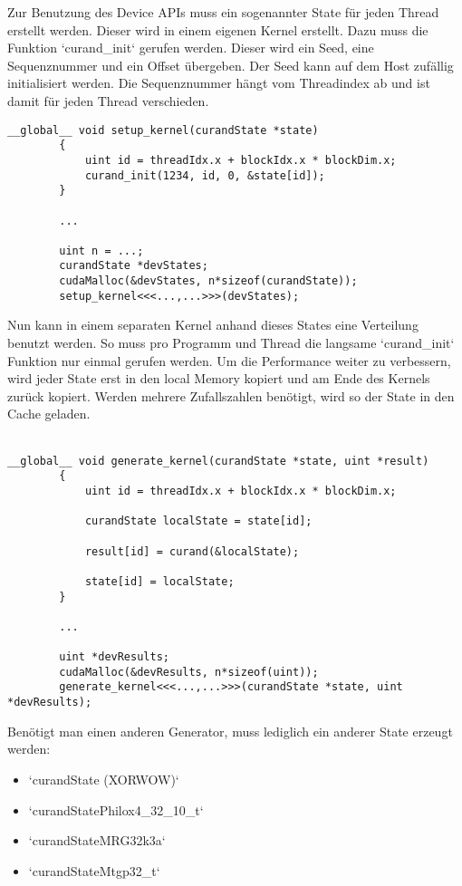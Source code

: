             Zur Benutzung des Device \Glspl{API} muss ein sogenannter State für jeden \Gls{Thread} erstellt werden. Dieser wird in einem eigenen \Gls{Kernel} erstellt.
            Dazu muss die Funktion \li`curand_init` gerufen werden. Dieser wird ein Seed, eine Sequenznummer und ein Offset übergeben. Der Seed kann auf dem Host zufällig initialisiert werden. Die Sequenznummer hängt vom \Gls{Thread}index ab und ist damit für jeden \Gls{Thread} verschieden.
            \begin{lstlisting}[caption=cuRAND: Device API States]
        __global__ void setup_kernel(curandState *state)
        {
            uint id = threadIdx.x + blockIdx.x * blockDim.x;
            curand_init(1234, id, 0, &state[id]);
        }
			
        ...
			
        uint n = ...;
        curandState *devStates;
        cudaMalloc(&devStates, n*sizeof(curandState));
        setup_kernel<<<...,...>>>(devStates);		
            \end{lstlisting}
			
            Nun kann in einem separaten \Gls{Kernel} anhand dieses States eine Verteilung benutzt werden. So muss pro Programm und \Gls{Thread} die langsame \li`curand_init` Funktion nur einmal gerufen werden. Um die Performance weiter zu verbessern, wird jeder State erst in den \gls{local Memory} kopiert und am Ende des \Glspl{Kernel} zurück kopiert. Werden mehrere Zufallszahlen benötigt, wird so der State in den Cache geladen.  \\ \\
            \begin{lstlisting}[caption=cuRAND: Device API Generierung]
        __global__ void generate_kernel(curandState *state, uint *result)
        {
            uint id = threadIdx.x + blockIdx.x * blockDim.x;

            curandState localState = state[id];

            result[id] = curand(&localState);
				
            state[id] = localState;
        }
			
        ...
			
        uint *devResults;
        cudaMalloc(&devResults, n*sizeof(uint));
        generate_kernel<<<...,...>>>(curandState *state, uint *devResults);
            \end{lstlisting}
			
            Benötigt man einen anderen Generator, muss lediglich ein anderer State erzeugt werden:
            \begin{itemize}
                \item \li`curandState (XORWOW)`
                \item \li`curandStatePhilox4_32_10_t`
                \item \li`curandStateMRG32k3a`
                \item \li`curandStateMtgp32_t`
            \end{itemize}
			
